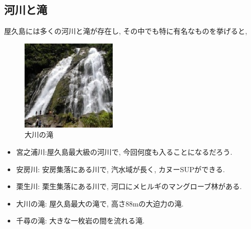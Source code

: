 \documentclass[10pt,titlepage,a5paper]{ltjsbook}
\begin{document}
    \subsection*{河川と滝}
      屋久島には多くの河川と滝が存在し, その中でも特に有名なものを挙げると,
      \begin{minipage}{0.38\columnwidth}
        \begin{figure}[H]
          \centering
          \includegraphics[width=\columnwidth]{okotaki.jpg}
          \caption{大川の滝}
          \label{fig:yakushima_river}
        \end{figure}
      \end{minipage}
      \begin{minipage}{0.58\columnwidth}
        \begin{itemize}
          \item 宮之浦川:屋久島最大級の河川で, 今回何度も入ることになるだろう.
          \item 安房川: 安房集落にある川で, 汽水域\footnotemark[4] が長く, カヌーSUPができる.
          \item 栗生川: 栗生集落にある川で, 河口にメヒルギのマングローブ林がある. 
          \item 大川の滝: 屋久島最大の滝で, 高さ88mの大迫力の滝.
          \item 千尋の滝: 大きな一枚岩の間を流れる滝. 
        \end{itemize}
      \end{minipage}
\end{document}
